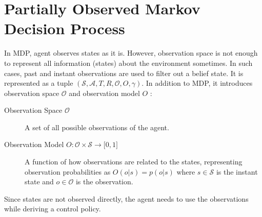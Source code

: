 \section{Partially Observed Markov Decision Process}
\label{sec:pomdp}

In MDP, agent observes states as it is. 
However, observation space is not enough to represent all information (states) about the environment sometimes. 
In such cases, past and instant observations are used to filter out a belief state. 
It is represented as a tuple $(\mathcal{S},\mathcal{A},T,R,\mathcal{O},O,\gamma)$. 
In addition to MDP, it introduces observation space $\mathcal{O}$ and observation model $O$ \cite{francois-lavet_introduction_2018}: 

\begin{description}
	\item[Observation Space $\mathcal{O}$] A set of all possible observations of the agent.
	\item[Observation Model $O \colon \mathcal{O} \times \mathcal{S} \rightarrow \lbrack 0,1 \rbrack$] A function of how observations are related to the states, 
	representing observation probabilities as $O(o|s) = p(o|s)$ 
	where $s \in \mathcal{S}$ is the instant state and $o \in \mathcal{O}$ is the observation.
\end{description}

Since states are not observed directly, the agent needs to use the observations while deriving a control policy. 